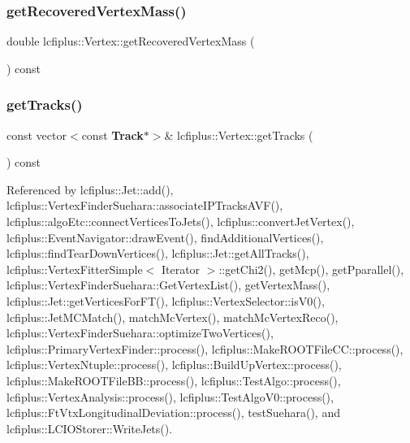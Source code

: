 \mbox{\label{classlcfiplus_1_1Vertex_a1493b6968ad2d20c14d89a387c7c0ec6}} 
\subsubsection{get\+Recovered\+Vertex\+Mass()}
{\footnotesize\ttfamily double lcfiplus\+::\+Vertex\+::get\+Recovered\+Vertex\+Mass (\begin{DoxyParamCaption}{ }\end{DoxyParamCaption}) const\hspace{0.3cm}{\ttfamily [inline]}}

\mbox{\label{classlcfiplus_1_1Vertex_ab4a9d38b6d1ae884cf594250cb7b83eb}} 
\subsubsection{get\+Tracks()}
{\footnotesize\ttfamily const vector$<$const \textbf{ Track}$\ast$$>$\& lcfiplus\+::\+Vertex\+::get\+Tracks (\begin{DoxyParamCaption}{ }\end{DoxyParamCaption}) const\hspace{0.3cm}{\ttfamily [inline]}}



Referenced by lcfiplus\+::\+Jet\+::add(), lcfiplus\+::\+Vertex\+Finder\+Suehara\+::associate\+I\+P\+Tracks\+A\+V\+F(), lcfiplus\+::algo\+Etc\+::connect\+Vertices\+To\+Jets(), lcfiplus\+::convert\+Jet\+Vertex(), lcfiplus\+::\+Event\+Navigator\+::draw\+Event(), find\+Additional\+Vertices(), lcfiplus\+::find\+Tear\+Down\+Vertices(), lcfiplus\+::\+Jet\+::get\+All\+Tracks(), lcfiplus\+::\+Vertex\+Fitter\+Simple$<$ Iterator $>$\+::get\+Chi2(), get\+Mcp(), get\+Pparallel(), lcfiplus\+::\+Vertex\+Finder\+Suehara\+::\+Get\+Vertex\+List(), get\+Vertex\+Mass(), lcfiplus\+::\+Jet\+::get\+Vertices\+For\+F\+T(), lcfiplus\+::\+Vertex\+Selector\+::is\+V0(), lcfiplus\+::\+Jet\+M\+C\+Match(), match\+Mc\+Vertex(), match\+Mc\+Vertex\+Reco(), lcfiplus\+::\+Vertex\+Finder\+Suehara\+::optimize\+Two\+Vertices(), lcfiplus\+::\+Primary\+Vertex\+Finder\+::process(), lcfiplus\+::\+Make\+R\+O\+O\+T\+File\+C\+C\+::process(), lcfiplus\+::\+Vertex\+Ntuple\+::process(), lcfiplus\+::\+Build\+Up\+Vertex\+::process(), lcfiplus\+::\+Make\+R\+O\+O\+T\+File\+B\+B\+::process(), lcfiplus\+::\+Test\+Algo\+::process(), lcfiplus\+::\+Vertex\+Analysis\+::process(), lcfiplus\+::\+Test\+Algo\+V0\+::process(), lcfiplus\+::\+Ft\+Vtx\+Longitudinal\+Deviation\+::process(), test\+Suehara(), and lcfiplus\+::\+L\+C\+I\+O\+Storer\+::\+Write\+Jets().

